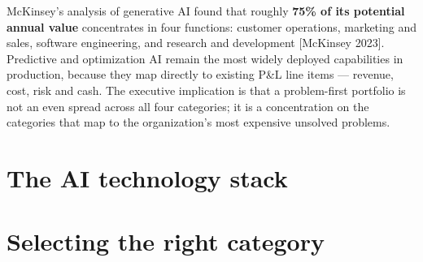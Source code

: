McKinsey's analysis of generative AI found that roughly \textbf{75\% of its
potential annual value} concentrates in four functions: customer operations,
marketing and sales, software engineering, and research and development
[McKinsey 2023]. Predictive and optimization AI remain the most widely
deployed capabilities in production, because they map directly to existing
P\&L line items — revenue, cost, risk and cash. The executive implication is
that a problem-first portfolio is not an even spread across all four
categories; it is a concentration on the categories that map to the
organization's most expensive unsolved problems.

\section{The AI technology stack}

\begin{center}
  \renewcommand{\arraystretch}{1.45}
\end{center}

\section{Selecting the right category}

